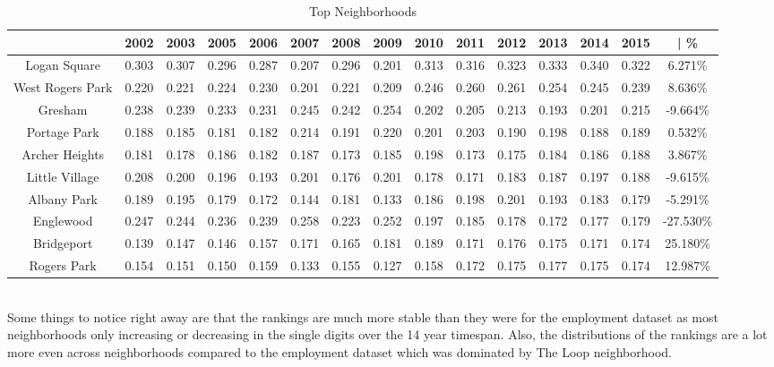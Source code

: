 \documentclass{article}
\theoremstyle{definition}
\theoremstyle{remark}
\begin{document}
\begin{table}[h]\centering
\caption{Top Neighborhoods}\label{thelabel}

\begin{adjustbox}{center}
\begin{tabular}{||c | c c c c c c c c c c c c c | c ||} 
 \hline
 & 2002 & 2003 & 2005 & 2006 & 2007 & 2008 & 2009 & 2010 & 2011 & 2012 & 2013 & 2014 & 2015 & | \%\\[0.5ex] 
 \hline\hline
Logan Square     & 0.303 & 0.307 & 0.296 & 0.287 & 0.207 & 0.296 & 0.201 & 0.313 & 0.316 & 0.323 & 0.333 & 0.340 & 0.322 & 6.271\% \\
West Rogers Park & 0.220 & 0.221 & 0.224 & 0.230 & 0.201 & 0.221 & 0.209 & 0.246 & 0.260 & 0.261 & 0.254 & 0.245 & 0.239 & 8.636\% \\
Gresham          & 0.238 & 0.239 & 0.233 & 0.231 & 0.245 & 0.242 & 0.254 & 0.202 & 0.205 & 0.213 & 0.193 & 0.201 & 0.215 & -9.664\% \\
Portage Park     & 0.188 & 0.185 & 0.181 & 0.182 & 0.214 & 0.191 & 0.220 & 0.201 & 0.203 & 0.190 & 0.198 & 0.188 & 0.189 & 0.532\% \\
Archer Heights   & 0.181 & 0.178 & 0.186 & 0.182 & 0.187 & 0.173 & 0.185 & 0.198 & 0.173 & 0.175 & 0.184 & 0.186 & 0.188 & 3.867\% \\
Little Village   & 0.208 & 0.200 & 0.196 & 0.193 & 0.201 & 0.176 & 0.201 & 0.178 & 0.171 & 0.183 & 0.187 & 0.197 & 0.188 & -9.615\% \\
Albany Park      & 0.189 & 0.195 & 0.179 & 0.172 & 0.144 & 0.181 & 0.133 & 0.186 & 0.198 & 0.201 & 0.193 & 0.183 & 0.179 & -5.291\% \\
Englewood        & 0.247 & 0.244 & 0.236 & 0.239 & 0.258 & 0.223 & 0.252 & 0.197 & 0.185 & 0.178 & 0.172 & 0.177 & 0.179 & -27.530\% \\
Bridgeport       & 0.139 & 0.147 & 0.146 & 0.157 & 0.171 & 0.165 & 0.181 & 0.189 & 0.171 & 0.176 & 0.175 & 0.171 & 0.174 & 25.180\% \\
Rogers Park      & 0.154 & 0.151 & 0.150 & 0.159 & 0.133 & 0.155 & 0.127 & 0.158 & 0.172 & 0.175 & 0.177 & 0.175 & 0.174 & 12.987\% \\ \hline
 \end{tabular}
\end{adjustbox}
\end{table}
\\

Some things to notice right away are that the rankings are much more stable than they were for the employment dataset as most neighborhoods only increasing or decreasing in the single digits over the 14 year timespan.  Also, the distributions of the rankings are a lot more even across neighborhoods compared to the employment dataset which was dominated by The Loop neighborhood. \\
\end{document}
